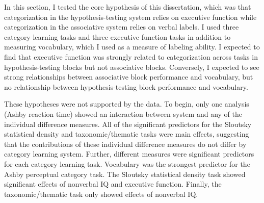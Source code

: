 \documentclass[../dissertation.tex]{subfiles}
\begin{document}
	In this section, I tested the core hypothesis of this dissertation, which was that categorization in the hypothesis-testing system relies on executive function while categorization in the associative system relies on verbal labels. I used three category learning tasks and three executive function tasks in addition to measuring vocabulary, which I used as a measure of labeling ability. I expected to find that executive function was strongly related to categorization across tasks in hypothesis-testing blocks but not associative blocks. Conversely, I expected to see strong relationships between associative block performance and vocabulary, but no relationship between hypothesis-testing block performance and vocabulary. \par 
	These hypotheses were not supported by the data. To begin, only one analysis (Ashby reaction time) showed an interaction between system and any of the individual difference measures. All of the significant predictors for the Sloutsky statistical density and taxonomic/thematic tasks were main effects, suggesting that the contributions of these individual difference measures do not differ by category learning system. Further, different measures were significant predictors for each category learning task. Vocabulary was the strongest predictor for the Ashby perceptual category task. The Sloutsky statistical density task showed significant effects of nonverbal IQ and executive function. Finally, the taxonomic/thematic task only showed effects of nonverbal IQ. \par
	
\end{document}
